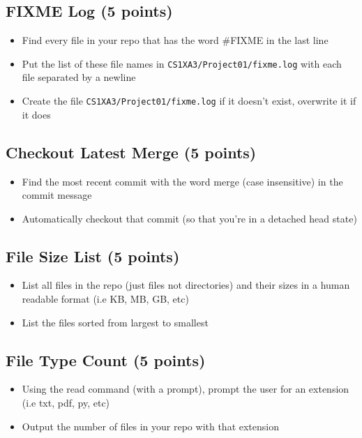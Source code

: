 \documentclass[11pt]{article}
\begin{document}
\subsection{FIXME Log (5 points)}
\label{sec:org3325a36}
\begin{itemize}
\item Find every file in your repo that has the word {\color{purple}\#FIXME} in the last line
\item Put the list of these file names in  \texttt{CS1XA3/Project01/fixme.log} with each file separated by a newline
\item Create the file \texttt{CS1XA3/Project01/fixme.log} if it doesn't exist, overwrite
it if it does
\end{itemize}
\subsection{Checkout Latest Merge (5 points)}
\label{sec:org1edbd79}
\begin{itemize}
\item Find the most recent commit with the word {\color{purple}merge} (case
insensitive) in the commit message
\item Automatically checkout that commit (so that you're in a detached head
state)
\end{itemize}
\subsection{File Size List (5 points)}
\label{sec:org04c3565}
\begin{itemize}
\item List all files in the repo (just files not directories) and their sizes in
a human readable format (i.e KB, MB, GB, etc)
\item List the files sorted from largest to smallest
\end{itemize}
\subsection{File Type Count (5 points)}
\label{sec:org6a6740d}
\begin{itemize}
\item Using the read command (with a prompt), prompt the user for an extension
(i.e txt, pdf, py, etc)
\item Output the number of files in your repo with that extension
\end{itemize}
\end{document}

